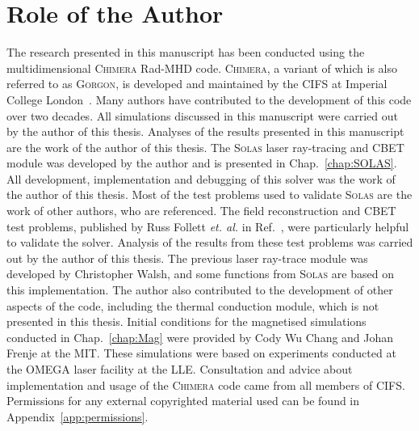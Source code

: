 \chapter*{Role of the Author}

The research presented in this manuscript has been conducted using the multidimensional \textsc{Chimera} \ac{Rad-MHD} code.
\textsc{Chimera}, a variant of which is also referred to as \textsc{Gorgon}, is developed and maintained by the \ac{CIFS} at Imperial College London~\cite{chittenden_xray_2004}.
Many authors have contributed to the development of this code over two decades.
All simulations discussed in this manuscript were carried out by the author of this thesis.
Analyses of the results presented in this manuscript are the work of the author of this thesis.
The \textsc{Solas} laser ray-tracing and \ac{CBET} module was developed by the author and is presented in Chap.~\ref{chap:SOLAS}.
All development, implementation and debugging of this solver was the work of the author of this thesis.
Most of the test problems used to validate \textsc{Solas} are the work of other authors, who are referenced.
The field reconstruction and \ac{CBET} test problems, published by Russ Follett \textit{et. al.} in Ref.~\cite{follett_validation_2022}, were particularly helpful to validate the solver.
Analysis of the results from these test problems was carried out by the author of this thesis.
The previous laser ray-trace module was developed by Christopher Walsh, and some functions from \textsc{Solas} are based on this implementation.
The author also contributed to the development of other aspects of the code, including the thermal conduction module, which is not presented in this thesis.
Initial conditions for the magnetised simulations conducted in Chap.~\ref{chap:Mag} were provided by Cody Wu Chang and Johan Frenje at the \ac{MIT}.
These simulations were based on experiments conducted at the \textsc{OMEGA} laser facility at the \ac{LLE}.
Consultation and advice about implementation and usage of the \textsc{Chimera} code came from all members of \ac{CIFS}.
Permissions for any external copyrighted material used can be found in Appendix~\ref{app:permissions}.